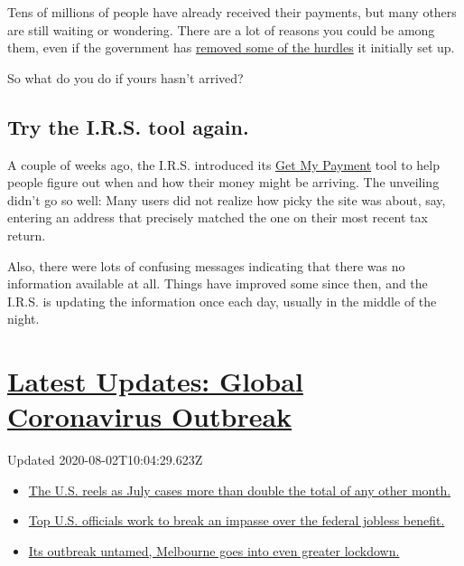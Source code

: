 Tens of millions of people have already received their payments, but
many others are still waiting or wondering. There are a lot of reasons
you could be among them, even if the government has
\href{https://www.nytimes.com/2020/04/01/business/coronavirus-stimulus-social-security.html}{removed
some of the hurdles} it initially set up.

So what do you do if yours hasn't arrived?

\hypertarget{try-the-irs-tool-again}{%
\subsection{Try the I.R.S. tool again.}\label{try-the-irs-tool-again}}

A couple of weeks ago, the I.R.S. introduced its
\href{https://www.irs.gov/coronavirus/get-my-payment}{Get My Payment}
tool to help people figure out when and how their money might be
arriving. The unveiling didn't go so well: Many users did not realize
how picky the site was about, say, entering an address that precisely
matched the one on their most recent tax return.

Also, there were lots of confusing messages indicating that there was no
information available at all. Things have improved some since then, and
the I.R.S. is updating the information once each day, usually in the
middle of the night.

\hypertarget{latest-updates-global-coronavirus-outbreak}{%
\section{\texorpdfstring{\href{https://www.nytimes.com/2020/08/01/world/coronavirus-covid-19.html?action=click\&pgtype=Article\&state=default\&region=MAIN_CONTENT_1\&context=storylines_live_updates}{Latest
Updates: Global Coronavirus
Outbreak}}{Latest Updates: Global Coronavirus Outbreak}}\label{latest-updates-global-coronavirus-outbreak}}

Updated 2020-08-02T10:04:29.623Z

\begin{itemize}
\tightlist
\item
  \href{https://www.nytimes.com/2020/08/01/world/coronavirus-covid-19.html?action=click\&pgtype=Article\&state=default\&region=MAIN_CONTENT_1\&context=storylines_live_updates\#link-34047410}{The
  U.S. reels as July cases more than double the total of any other
  month.}
\item
  \href{https://www.nytimes.com/2020/08/01/world/coronavirus-covid-19.html?action=click\&pgtype=Article\&state=default\&region=MAIN_CONTENT_1\&context=storylines_live_updates\#link-780ec966}{Top
  U.S. officials work to break an impasse over the federal jobless
  benefit.}
\item
  \href{https://www.nytimes.com/2020/08/01/world/coronavirus-covid-19.html?action=click\&pgtype=Article\&state=default\&region=MAIN_CONTENT_1\&context=storylines_live_updates\#link-2bc8948}{Its
  outbreak untamed, Melbourne goes into even greater lockdown.}
\end{itemize}

